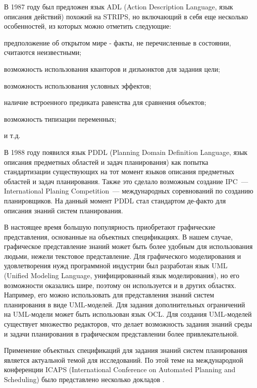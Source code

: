     В 1987 году был предложен язык ADL (Action Description Language, язык описания действий) похожий на STRIPS, но включающий в себя еще несколько особенностей, из которых можно отметить следующие:
    \begin{compactlist}
        \item предположение об открытом мире - факты, не перечисленные в состоянии, считаются неизвестными;
        \item возможность использования кванторов и дизъюнктов для задания цели;
        \item возможность использования условных эффектов;
        \item наличие встроенного предиката равенства для сравнения объектов;
        \item возможность типизации переменных;
        \item и т.д.
    \end{compactlist}
    
    В 1988 году появился язык PDDL\cite{pddl3} (Planning Domain Definition Language, язык описания предметных областей и задач планирования) как попытка стандартизации существующих на тот момент языков описания предметных областей и задач планирования.
 Также это сделало возможным создание IPC~--- International Planing Competition~--- международных соревнований по созданию планировщиков.
 На данный момент PDDL стал стандартом де-факто для описания знаний систем планирования.
  
    В настоящее время большую популярность приобретают графические представления, основанные на объектных спецификациях.
 В нашем случае, графическое представление знаний может быть более удобным для использования людьми, нежели текстовое представление.
 Для графического моделирования и удовлетворения нужд программной индустрии был разработан язык UML\cite{rambo-uml2} (Unified Modeling Language, унифицированный язык моделирования), но его возможности оказались шире, поэтому он используется и в других областях.
 Например, его можно использовать для представления знаний систем планирования в виде UML-моделей.
 Для задания дополнительных ограничений на UML-модели может быть использован язык OCL\cite{ocl}.
 Для создания UML-моделей существует множество редакторов, что делает возможность задания знаний среды и задачи планирования в графическом представлении более привлекательной.
     
    Применение объектных спецификаций для задания знаний систем планирования является актуальной темой для исследований.
  По этой теме на международной конференции ICAPS (International Conference on Automated Planning and Scheduling) было представлено несколько докладов \cite{icaps-1, icaps-2}.

\newpage